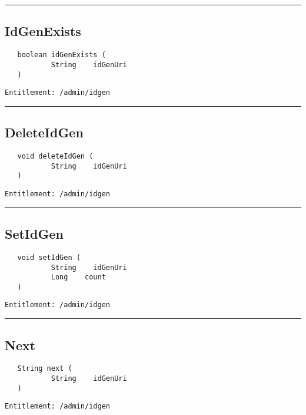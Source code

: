 \rule{12cm}{2pt}
\subsection{IdGenExists}
\label{Api:IdGenExists}
\begin{verbatim}
   boolean idGenExists (
           String    idGenUri
   )
\end{verbatim}
\begin{Verbatim}[fontsize=\small, formatcom=\color{Maroon}]
  Entitlement: /admin/idgen
\end{Verbatim}



\rule{12cm}{2pt}
\subsection{DeleteIdGen}
\label{Api:DeleteIdGen}
\begin{verbatim}
   void deleteIdGen (
           String    idGenUri
   )
\end{verbatim}
\begin{Verbatim}[fontsize=\small, formatcom=\color{Maroon}]
  Entitlement: /admin/idgen
\end{Verbatim}



\rule{12cm}{2pt}
\subsection{SetIdGen}
\label{Api:SetIdGen}
\begin{verbatim}
   void setIdGen (
           String    idGenUri
           Long    count
   )
\end{verbatim}
\begin{Verbatim}[fontsize=\small, formatcom=\color{Maroon}]
  Entitlement: /admin/idgen
\end{Verbatim}



\rule{12cm}{2pt}
\subsection{Next}
\label{Api:Next}
\begin{verbatim}
   String next (
           String    idGenUri
   )
\end{verbatim}
\begin{Verbatim}[fontsize=\small, formatcom=\color{Maroon}]
  Entitlement: /admin/idgen
\end{Verbatim}



